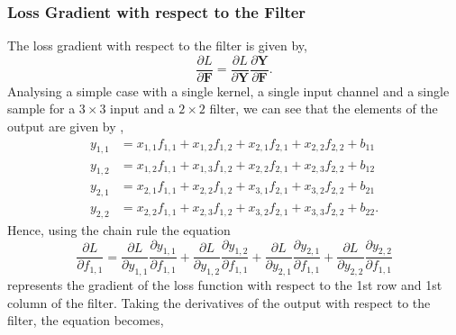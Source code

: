 \documentclass[twocolumn,pra,floatfix]{revtex4-2}
\begin{document}
                
            \subsubsection{Loss Gradient with respect to the Filter}
            
                The loss gradient with respect to the filter is given by,
                \begin{equation}
                    \frac{\partial L}{\partial \mathbf{F}} = \frac{\partial L}{\partial \mathbf{Y}} \frac{\partial \mathbf{Y}}{\partial \mathbf{F}}.
                \end{equation}
                Analysing a simple case with a single kernel, a single input channel and a single sample for a $3 \times 3$ input and a $2 \times 2$ filter, we can see that the elements of the output are given by \cite{Solai2018},
                \begin{equation}
                    \begin{aligned}
                        y_{1,1} &= x_{1,1}f_{1,1} + x_{1,2}f_{1,2} + x_{2,1}f_{2,1} + x_{2,2}f_{2,2} + 
                        b_{11} \\
                        y_{1,2} &= x_{1,2}f_{1,1} + x_{1,3}f_{1,2} + x_{2,2}f_{2,1} + x_{2,3}f_{2,2} + 
                        b_{12} \\
                        y_{2,1} &= x_{2,1}f_{1,1} + x_{2,2}f_{1,2} + x_{3,1}f_{2,1} + x_{3,2}f_{2,2} + 
                        b_{21} \\
                        y_{2,2} &= x_{2,2}f_{1,1} + x_{2,3}f_{1,2} + x_{3,2}f_{2,1} + x_{3,3}f_{2,2} +
                        b_{22}.
                    \end{aligned}\label{eq:22}
                \end{equation}
                Hence, using the chain rule the equation
                \begin{equation}
                    \frac{\partial L}{\partial f_{1,1}} = \frac{\partial L}{\partial y_{1,1}} \frac{\partial y_{1,1}}{\partial f_{1,1}} + \frac{\partial L}{\partial y_{1,2}} \frac{\partial y_{1,2}}{\partial f_{1,1}} + \frac{\partial L}{\partial y_{2,1}} \frac{\partial y_{2,1}}{\partial f_{1,1}} + \frac{\partial L}{\partial y_{2,2}} \frac{\partial y_{2,2}}{\partial f_{1,1}}
                \end{equation}
                represents the gradient of the loss function with respect to the 1st row and 1st column of the filter. Taking the derivatives of the output with respect to the filter, the equation becomes,
\end{document}
